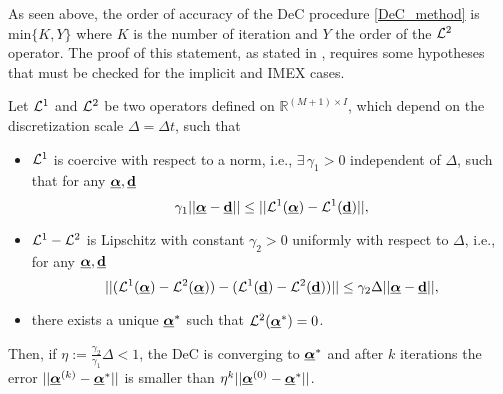 As seen above, the order of accuracy of the DeC procedure \eqref{DeC_method} is $\textrm{min}\{K,Y\}$ where $K$ is the number of iteration and $Y$ the order of the $\mathcal L^2$ operator.
The proof of this statement, as stated in \cite{abgrall2017dec, Han_Veiga_2021,veiga2023improving}, requires some hypotheses that must be checked for the implicit and IMEX cases.
\begin{proposition}\label{DeC_prop}
	Let $\mathcal L^1$ and $\mathcal L^2$ be two operators defined on $\mathbb{R}^{(M+1)\times I}$, 
	which depend on the discretization scale $\Delta = \Delta t$, such that
	\begin{itemize}
		\item[\namedlabel{itm:coercivity}{\bf{C1.}}] $\mathcal L^1$ is coercive with respect to a norm, i.e., 
		$\exists\, \gamma_1 >0$ independent of $\Delta$, such that for any $\underline{\boldsymbol{\alpha}},\underline{\mathbf{d}}$
		$$\gamma_1||\underline{\boldsymbol{\alpha}}-\underline{\mathbf{d}}||\leq ||\mathcal L^1 (\underline{\boldsymbol{\alpha}})-\mathcal L^1 (\underline{\mathbf{d}})||,$$
		\item[\namedlabel{itm:Lipschitz}{\bf{C2.}}] $\mathcal L^1 - \mathcal L^2$ is Lipschitz with constant $\gamma_2>0$
		uniformly with respect to $\Delta$, i.e., for any $\underline{\boldsymbol{\alpha}},\underline{\mathbf{d}}$
		$$
		||(\mathcal L^1(\underline{\boldsymbol{\alpha}})-\mathcal L^2(\underline{\boldsymbol{\alpha}}))-(\mathcal L^1(\underline{\mathbf{d}})-\mathcal L^2(\underline{\mathbf{d}}))||\leq \gamma_2 \Delta ||\underline{\boldsymbol{\alpha}}-\underline{\mathbf{d}}||,
		$$
		\item[\namedlabel{itm:existence}{\bf{C3.}}] there exists a 
		unique $\underline{\boldsymbol{\alpha}}^*$ such that $\mathcal L^2(\underline{\boldsymbol{\alpha}}^*)=0$. 
	\end{itemize}
	Then, if $\eta:=\frac{\gamma_2}{\gamma_1}\Delta<1$,
	the DeC is converging to $\underline{\boldsymbol{\alpha}}^*$ and after $k$ iterations
	the error $||\underline{\boldsymbol{\alpha}}^{(k)}-\underline{\boldsymbol{\alpha}}^*||$ is smaller than $\eta^k||\underline{\boldsymbol{\alpha}}^{(0)}-\underline{\boldsymbol{\alpha}}^{*}||$.
\end{proposition}

